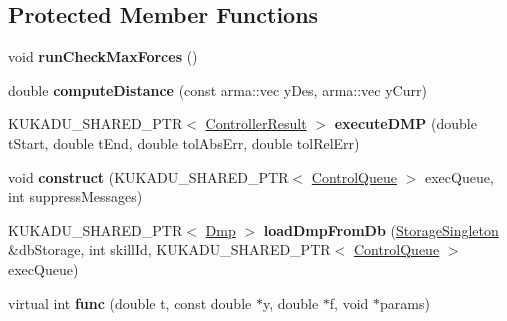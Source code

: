 \subsection*{Protected Member Functions}
\begin{DoxyCompactItemize}
\item 
void {\bfseries run\+Check\+Max\+Forces} ()\hypertarget{classkukadu_1_1DMPExecutor_ab3c4a6e121917b95259aabfcfc348c5b}{}\label{classkukadu_1_1DMPExecutor_ab3c4a6e121917b95259aabfcfc348c5b}

\item 
double {\bfseries compute\+Distance} (const arma\+::vec y\+Des, arma\+::vec y\+Curr)\hypertarget{classkukadu_1_1DMPExecutor_acc239e5c025fca330fac28590e25721e}{}\label{classkukadu_1_1DMPExecutor_acc239e5c025fca330fac28590e25721e}

\item 
K\+U\+K\+A\+D\+U\+\_\+\+S\+H\+A\+R\+E\+D\+\_\+\+P\+TR$<$ \hyperlink{classkukadu_1_1ControllerResult}{Controller\+Result} $>$ {\bfseries execute\+D\+MP} (double t\+Start, double t\+End, double tol\+Abs\+Err, double tol\+Rel\+Err)\hypertarget{classkukadu_1_1DMPExecutor_ac7930124bda370eed2097e5edbc764cd}{}\label{classkukadu_1_1DMPExecutor_ac7930124bda370eed2097e5edbc764cd}

\item 
void {\bfseries construct} (K\+U\+K\+A\+D\+U\+\_\+\+S\+H\+A\+R\+E\+D\+\_\+\+P\+TR$<$ \hyperlink{classkukadu_1_1ControlQueue}{Control\+Queue} $>$ exec\+Queue, int suppress\+Messages)\hypertarget{classkukadu_1_1DMPExecutor_a4f2449a898734b31d1c54d5ef35df298}{}\label{classkukadu_1_1DMPExecutor_a4f2449a898734b31d1c54d5ef35df298}

\item 
K\+U\+K\+A\+D\+U\+\_\+\+S\+H\+A\+R\+E\+D\+\_\+\+P\+TR$<$ \hyperlink{classkukadu_1_1Dmp}{Dmp} $>$ {\bfseries load\+Dmp\+From\+Db} (\hyperlink{classkukadu_1_1StorageSingleton}{Storage\+Singleton} \&db\+Storage, int skill\+Id, K\+U\+K\+A\+D\+U\+\_\+\+S\+H\+A\+R\+E\+D\+\_\+\+P\+TR$<$ \hyperlink{classkukadu_1_1ControlQueue}{Control\+Queue} $>$ exec\+Queue)\hypertarget{classkukadu_1_1DMPExecutor_aa1178d0604f8165285bfe6c87f58b440}{}\label{classkukadu_1_1DMPExecutor_aa1178d0604f8165285bfe6c87f58b440}

\item 
virtual int {\bfseries func} (double t, const double $\ast$y, double $\ast$f, void $\ast$params)\hypertarget{classkukadu_1_1DMPExecutor_a36fbd2e7ec4aa92d3547716781e92c25}{}\label{classkukadu_1_1DMPExecutor_a36fbd2e7ec4aa92d3547716781e92c25}


\end{DoxyCompactItemize}
